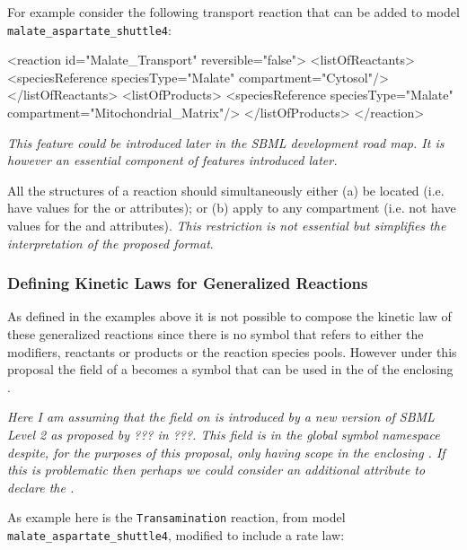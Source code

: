 \documentclass{cekarticle}
\begin{document}
For example consider the following transport reaction that can be added to model
\texttt{malate\_aspartate\_shuttle4}:

\begin{example}
<reaction id="Malate_Transport" reversible="false">
    <listOfReactants>
        <speciesReference speciesType="Malate" compartment="Cytosol"/>
    </listOfReactants>
    <listOfProducts>
        <speciesReference speciesType="Malate" compartment="Mitochondrial_Matrix"/>
    </listOfProducts>
</reaction>
\end{example}

\emph{This feature could be introduced later in the SBML development road map.
It is however an essential component of features introduced later.}

All the  structures of a reaction should simultaneously either
(a) be located (i.e. have values for the  or  attributes);
or (b) apply to any compartment (i.e. not have values for the  and 
attributes). \emph{This restriction is not essential but simplifies the interpretation of
the proposed format}.

\subsubsection{Defining Kinetic Laws for Generalized Reactions}

As defined in the examples above it is not possible to compose the kinetic law of these generalized
reactions since there is no symbol that refers to either the modifiers, reactants or products or the
reaction species pools.  However under this proposal the  field of a
 becomes a symbol that can be used in the  of the 
enclosing .

\emph{Here I am assuming that the  field on  is introduced by a
new version of SBML Level 2 as proposed by ??? in ???. This  field is in the global symbol
namespace despite, for the purposes of this proposal, only having scope in the enclosing
.  If this is problematic then perhaps we could consider an additional attribute to
declare the .}

As example here is the \texttt{Transamination} reaction, from model
\texttt{malate\_aspartate\_shuttle4}, modified to include a rate law:
\end{document}
